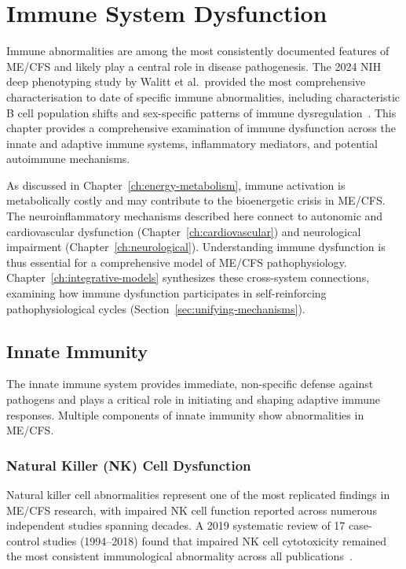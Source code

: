 \chapter{Immune System Dysfunction}
\label{ch:immune-dysfunction}

Immune abnormalities are among the most consistently documented features of ME/CFS and likely play a central role in disease pathogenesis. The 2024 NIH deep phenotyping study by Walitt et al.\ provided the most comprehensive characterisation to date of specific immune abnormalities, including characteristic B cell population shifts and sex-specific patterns of immune dysregulation~\cite{walitt2024deep}. This chapter provides a comprehensive examination of immune dysfunction across the innate and adaptive immune systems, inflammatory mediators, and potential autoimmune mechanisms.

As discussed in Chapter~\ref{ch:energy-metabolism}, immune activation is metabolically costly and may contribute to the bioenergetic crisis in ME/CFS. The neuroinflammatory mechanisms described here connect to autonomic and cardiovascular dysfunction (Chapter~\ref{ch:cardiovascular}) and neurological impairment (Chapter~\ref{ch:neurological}). Understanding immune dysfunction is thus essential for a comprehensive model of ME/CFS pathophysiology. Chapter~\ref{ch:integrative-models} synthesizes these cross-system connections, examining how immune dysfunction participates in self-reinforcing pathophysiological cycles (Section~\ref{sec:unifying-mechanisms}).

\section{Innate Immunity}
\label{sec:innate-immunity}

The innate immune system provides immediate, non-specific defense against pathogens and plays a critical role in initiating and shaping adaptive immune responses. Multiple components of innate immunity show abnormalities in ME/CFS.

\subsection{Natural Killer (NK) Cell Dysfunction}
\label{sec:nk-cells}

Natural killer cell abnormalities represent one of the most replicated findings in ME/CFS research, with impaired NK cell function reported across numerous independent studies spanning decades. A 2019 systematic review of 17 case-control studies (1994--2018) found that impaired NK cell cytotoxicity remained the most consistent immunological abnormality across all publications~\cite{EatonFitch2019}.

